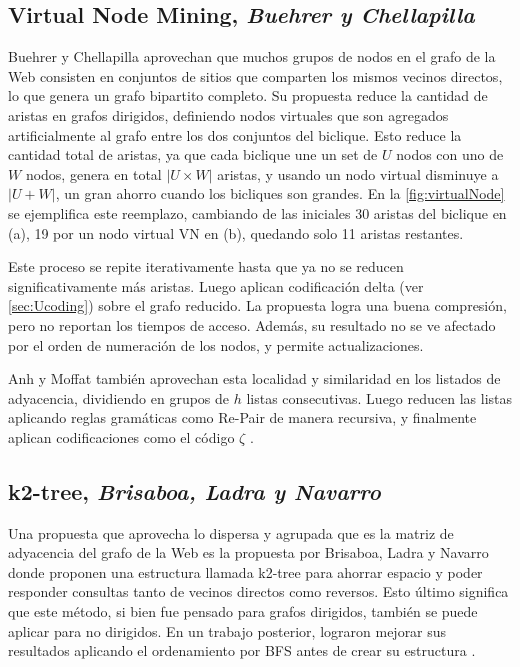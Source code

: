 \subsection{Virtual Node Mining, \textit{Buehrer y Chellapilla}}
Buehrer y Chellapilla \cite{BuehrerChellapilla} aprovechan que muchos grupos de nodos en el grafo de la Web consisten en conjuntos de sitios que comparten los mismos vecinos directos, lo que genera un grafo bipartito completo. Su propuesta reduce la cantidad de aristas en grafos dirigidos, definiendo nodos virtuales que son agregados artificialmente al grafo entre los dos conjuntos del biclique. Esto reduce la cantidad total de aristas, ya que cada biclique une un set de $U$ nodos con uno de $W$ nodos, genera en total $|U \times W|$ aristas, y usando un nodo virtual disminuye a $|U + W|$, un gran ahorro cuando los bicliques son grandes. En la \autoref{fig:virtualNode} se ejemplifica este reemplazo, cambiando de las iniciales 30 aristas del biclique en (a), 19 por un nodo virtual VN en (b), quedando solo 11 aristas restantes.



Este proceso se repite iterativamente hasta que ya no se reducen significativamente más aristas. Luego aplican codificación delta (ver \autoref{sec:Ucoding}) sobre el grafo reducido. La propuesta logra una buena compresión, pero no reportan los tiempos de acceso. Además, su resultado no se ve afectado por el orden de numeración de los nodos, y permite actualizaciones.

Anh y Moffat \cite{anh2010local} también aprovechan esta localidad y similaridad en los listados de adyacencia, dividiendo en grupos de $h$ listas consecutivas. Luego reducen las listas aplicando reglas gramáticas como Re-Pair \cite{larsson2000off} de manera recursiva, y finalmente aplican codificaciones como el código $\zeta$ \cite{boldi2005codes}.


\subsection{k2-tree, \textit{Brisaboa, Ladra y Navarro}}
Una propuesta que aprovecha lo dispersa y agrupada que es la matriz de adyacencia del grafo de la Web es la propuesta por Brisaboa, Ladra y Navarro \cite{brisaboa2009k} donde proponen una estructura llamada k2-tree para ahorrar espacio y poder responder consultas tanto de vecinos directos como reversos. Esto último significa que este método, si bien fue pensado para grafos dirigidos, también se puede aplicar para no dirigidos. En un trabajo posterior, lograron mejorar sus resultados aplicando el ordenamiento por BFS antes de crear su estructura \cite{brisaboa2014compact}.

